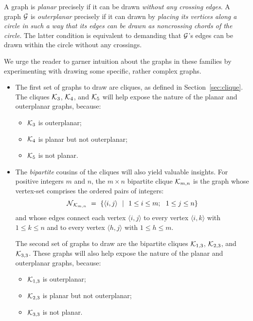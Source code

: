 \noindent
A graph is {\it planar}  precisely if it can be drawn {\em without any crossing edges}.
A graph $\mbox{$\cal G$}$ is {\it outerplanar} precisely if it can drawn by {\em placing its vertices along a circle
in such a way that its edges can be drawn as noncrossing chords of the circle}.  The latter condition is
equivalent to demanding that $\mbox{$\cal G$}$'s edges can be drawn within the circle without any crossings.

We urge the reader to garner intuition about the graphs in these
families by experimenting with drawing some specific, rather complex graphs.
\begin{itemize}
\item
The first set of graphs to draw are cliques, as defined in
Section~\ref{sec:clique}.  The cliques $\mbox{$\cal K$}_3$, $\mbox{$\cal K$}_4$, and
$\mbox{$\cal K$}_5$ will help expose the nature of the planar and outerplanar
graphs, because:
  \begin{itemize}
  \item
$\mbox{$\cal K$}_3$ is outerplanar; 
  \item
$\mbox{$\cal K$}_4$ is planar but not outerplanar;
  \item
$\mbox{$\cal K$}_5$ is not planar.
  \end{itemize}

\item
The {\em bipartite} cousins of the cliques will also yield valuable insights.  For positive 
integers $m$ and $n$, the $m \times n$ bipartite clique $\mbox{$\cal K$}_{m,n}$ is the graph
whose vertex-set comprises the ordered pairs of integers:
\[  \mbox{$\cal N$}_{\mbox{{\scriptsize $\cal K$}}_{m,n}} \ = \
\{ \langle i,j \rangle \ \ | \ \ 1 \leq i \leq m; \ \ 1 \leq j \leq n\}
\]
and whose edges connect each vertex $\langle i,j \rangle$ to every vertex
$\langle i,k \rangle$ with $1 \leq k \leq n$ and to every vertex
$\langle h,j \rangle$ with $1 \leq h \leq m$.

The second set of graphs to draw are the bipartite cliques $\mbox{$\cal K$}_{1,3}$,
$\mbox{$\cal K$}_{2,3}$, and $\mbox{$\cal K$}_{3,3}$.  These graphs will also help expose the
nature of the planar and outerplanar graphs, because:
  \begin{itemize}
  \item
$\mbox{$\cal K$}_{1,3}$ is outerplanar; 
  \item
$\mbox{$\cal K$}_{2,3}$ is planar but not outerplanar;
  \item
$\mbox{$\cal K$}_{3,3}$ is not planar.
  \end{itemize}
\end{itemize}

